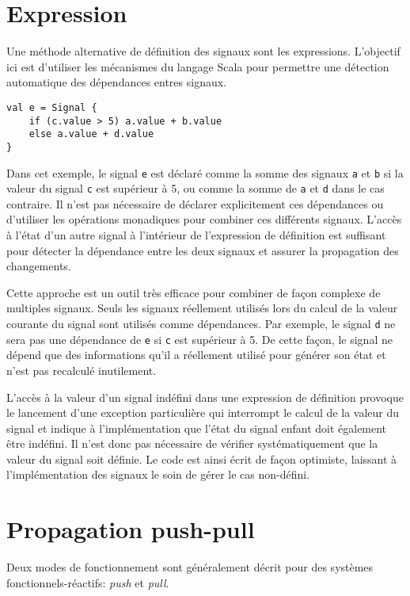 \section{Expression}

	Une méthode alternative de définition des signaux sont les expressions. L'objectif ici est d'utiliser les mécanismes du langage Scala pour permettre une détection automatique des dépendances entres signaux.
	\begin{lstlisting}
val e = Signal {
	if (c.value > 5) a.value + b.value
	else a.value + d.value
}
	\end{lstlisting}
	Dans cet exemple, le signal \texttt{e} est déclaré comme la somme des signaux \texttt{a} et \texttt{b} si la valeur du signal \texttt{c} est supérieur à 5, ou comme la somme de \texttt{a} et \texttt{d} dans le cas contraire. Il n'est pas nécessaire de déclarer explicitement ces dépendances ou d'utiliser les opérations monadiques pour combiner ces différents signaux. L'accès à l'état d'un autre signal à l'intérieur de l'expression de définition est suffisant pour détecter la dépendance entre les deux signaux et assurer la propagation des changements.
	
	Cette approche est un outil très efficace pour combiner de façon complexe de multiples signaux. Seuls les signaux réellement utilisés lors du calcul de la valeur courante du signal sont utilisés comme dépendances. Par exemple, le signal \texttt{d} ne sera pas une dépendance de \texttt{e} si \texttt{c} est supérieur à 5. De cette façon, le signal ne dépend que des informations qu'il a réellement utilisé pour générer son état et n'est pas recalculé inutilement.
	
	L'accès à la valeur d'un signal indéfini dans une expression de définition provoque le lancement d'une exception particulière qui interrompt le calcul de la valeur du signal et indique à l'implémentation que l'état du signal enfant doit également être indéfini. Il n'est donc pas nécessaire de vérifier systématiquement que la valeur du signal soit définie. Le code est ainsi écrit de façon optimiste, laissant à l'implémentation des signaux le soin de gérer le cas non-défini.

\section{Propagation push-pull}

	Deux modes de fonctionnement sont généralement décrit pour des systèmes fonctionnels-réactifs: \emph{push} et \emph{pull}.
	
